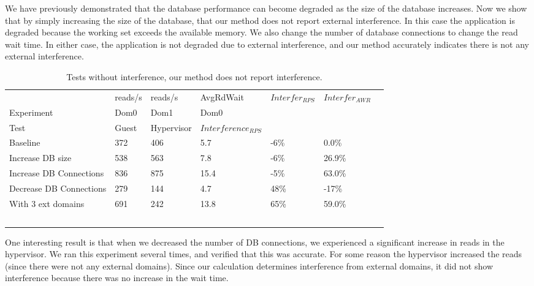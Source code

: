 We have previously demonstrated that the database performance can become degraded as the size of the database increases.  Now we show that by simply increasing the size of the database, that our method does not report external interference.  In this case the application is degraded because the working set exceeds the available memory.  We also change the number of database connections to change the read wait time.  In either case, the application is not degraded due to external interference, and our method accurately indicates there is not any external interference.

\begin{table}[h]
\begingroup
    \fontsize{10pt}{12pt}\selectfont
\begin{tabular}{ l l l l l l p{9cm} }
                   & reads/s & reads/s & AvgRdWait & $Interfer_{RPS}$ & $Interfer_{AWR}$ \\
	Experiment     & Dom0     & Dom1     & Dom0      &                &             \\

    Test & Guest & Hypervisor  & $Interference_{RPS}$ \\
    \hline
    Baseline                   & 372 & 406 & 5.7 & -6\% & 0.0\%   \\  %
    Increase DB size           & 538 & 563 & 7.8 & -6\% & 26.9\% \\  %
    Increase DB Connections    & 836 & 875 &15.4 & -5\% & 63.0\% \\  %
	Decrease DB Connections    & 279 & 144 & 4.7 & 48\% & -17\%  \\  %
    With 3 ext domains         & 691 & 242 &13.8 & 65\% & 59.0\% \\  %
    \hline
  \end{tabular}
\caption{Tests without interference, our method does not report interference. }
\label{tab:HypervisorGuest}
\endgroup
\end{table}

One interesting result is that when we decreased the number of DB connections, we experienced a significant increase in reads in the hypervisor.  We ran this experiment several times, and verified that this was accurate.  For some reason the hypervisor increased the reads (since there were not any external domains).  Since our calculation determines interference from external domains, it did not show interference because there was no increase in the wait time.

